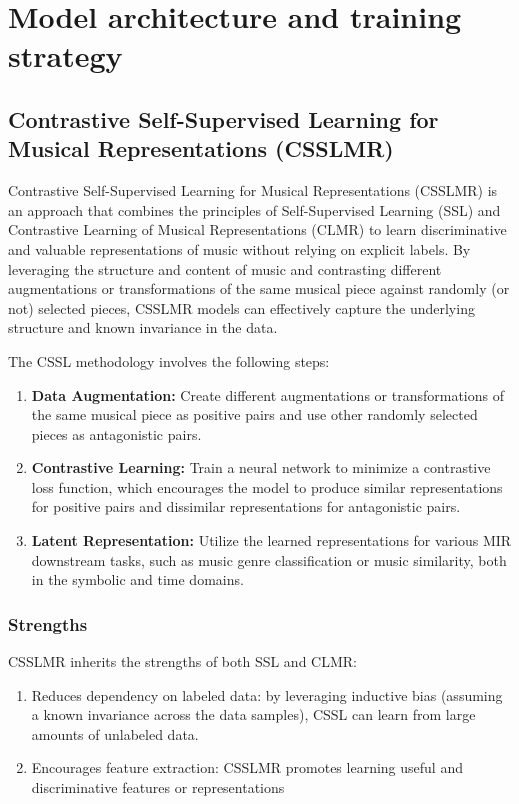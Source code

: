\section{Model architecture and training strategy}
\subsection{Contrastive Self-Supervised Learning for Musical Representations (CSSLMR)}

Contrastive Self-Supervised Learning for Musical Representations (CSSLMR) is an approach that combines the principles of Self-Supervised Learning (SSL) and Contrastive Learning of Musical Representations (CLMR) to learn discriminative and valuable representations of music without relying on explicit labels. By leveraging the structure and content of music and contrasting different augmentations or transformations of the same musical piece against randomly (or not) selected pieces, CSSLMR models can effectively capture the underlying structure and known invariance in the data.

The CSSL methodology involves the following steps:

\begin{enumerate}
\item \textbf{Data Augmentation:} Create different augmentations or transformations of the same musical piece as positive pairs and use other randomly selected pieces as antagonistic pairs.
\item \textbf{Contrastive Learning:} Train a neural network to minimize a contrastive loss function, which encourages the model to produce similar representations for positive pairs and dissimilar representations for antagonistic pairs.
\item\textbf{Latent Representation:} Utilize the learned representations for various MIR downstream tasks, such as music genre classification or music similarity, both in the symbolic and time domains.
\end{enumerate} 

\subsubsection{Strengths}

CSSLMR inherits the strengths of both SSL and CLMR:

\begin{enumerate}
\item Reduces dependency on labeled data: by leveraging inductive bias (assuming a known invariance across the data samples), CSSL can learn from large amounts of unlabeled data.
\item Encourages feature extraction: CSSLMR promotes learning useful and discriminative features or representations
\end{enumerate} 

